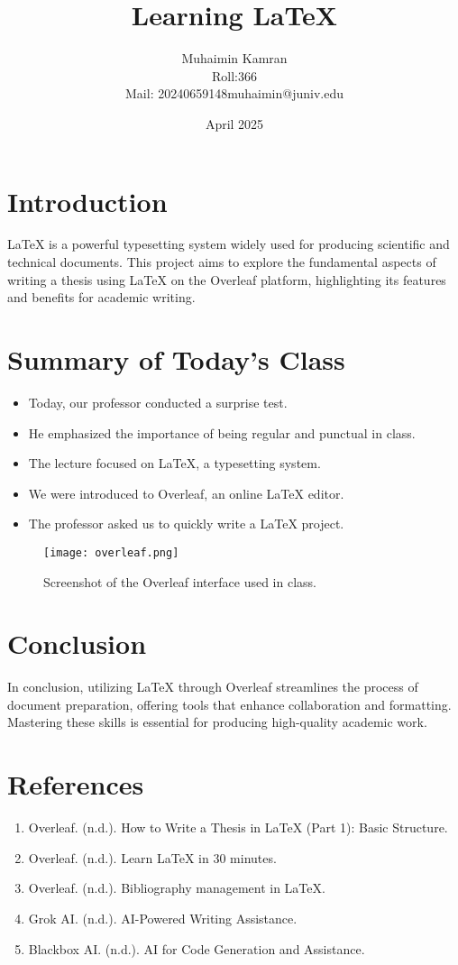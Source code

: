 \documentclass[12pt]{report}
\title{Learning LaTeX}
\author{Muhaimin Kamran \\ Roll:366 \\ Mail: 20240659148muhaimin@juniv.edu}
\date{April 2025}
\begin{document}
\maketitle

\section*{Introduction}
LaTeX is a powerful typesetting system widely used for producing scientific and technical documents. This project aims to explore the fundamental aspects of writing a thesis using LaTeX on the Overleaf platform, highlighting its features and benefits for academic writing.

\section*{Summary of Today's Class}
\begin{itemize}
    \item Today, our professor conducted a surprise test.
    \item He emphasized the importance of being regular and punctual in class.
    \item The lecture focused on LaTeX, a typesetting system.
    \item We were introduced to Overleaf, an online LaTeX editor.
    \item The professor asked us to quickly write a LaTeX project.
\end{itemize}

\begin{figure}[h]
    \centering
    \texttt{[image: overleaf.png]} %
    \caption{Screenshot of the Overleaf interface used in class.}
    \label{fig:overleaf}
\end{figure}

\section*{Conclusion}
In conclusion, utilizing LaTeX through Overleaf streamlines the process of document preparation, offering tools that enhance collaboration and formatting. Mastering these skills is essential for producing high-quality academic work.

\section*{References}
\begin{enumerate}
    \item Overleaf. (n.d.). How to Write a Thesis in LaTeX (Part 1): Basic Structure. 
    \item Overleaf. (n.d.). Learn LaTeX in 30 minutes.
    \item Overleaf. (n.d.). Bibliography management in LaTeX. 
    \item Grok AI. (n.d.). AI-Powered Writing Assistance. 
    \item Blackbox AI. (n.d.). AI for Code Generation and Assistance.
\end{enumerate}
\end{document}
